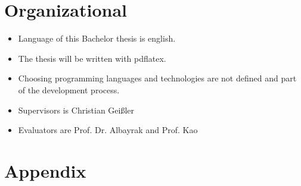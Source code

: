 \documentclass[12pt,a4paper,titlepage,oneside,BCOR1cm]{scrreprt}
\begin{document}
\chapter{Organizational}
\begin{itemize}
\item Language of this Bachelor thesis is english.
\item The thesis will be written with pdflatex.
\item Choosing programming languages and technologies are not defined and part of the development process.
\item Supervisors is Christian Geißler
\item Evaluators are Prof. Dr. Albayrak and Prof. Kao
\end{itemize}

\chapter{Appendix}
\newpage

\nocite{*}

\printbibliography
\end{document}
